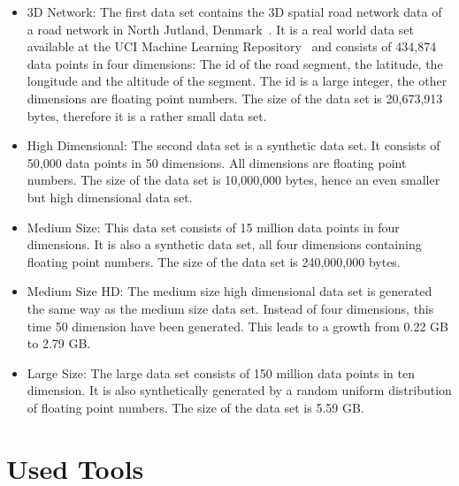\begin{itemize} 
\item 3D Network: The first data set contains the 3D spatial road network data of a road network in North Jutland, Denmark~\parencite{3dnet}. It is a real world data set available at the UCI Machine Learning Repository~\parencite{uci} and consists of 434,874 data points in four dimensions: The id of the road segment, the latitude, the longitude and the altitude of the segment. The id is a large integer, the other dimensions are floating point numbers. The size of the data set is 20,673,913 bytes, therefore it is a rather small data set.

\item High Dimensional: The second data set is a synthetic data set. It consists of 50,000 data points in 50 dimensions. All dimensions are floating point numbers. The size of the data set is 10,000,000 bytes, hence an even smaller but high dimensional data set.

\item Medium Size: This data set consists of 15 million data points in four dimensions. It is also a synthetic data set, all four dimensions containing floating point numbers. The size of the data set is 240,000,000 bytes.

\item Medium Size HD: The medium size high dimensional data set is generated the same way as the medium size data set. Instead of four dimensions, this time 50 dimension have been generated. This leads to a growth from 0.22 GB to 2.79 GB.  

\item Large Size: The large data set consists of 150 million data points in ten dimension. It is also synthetically generated by a random uniform distribution of floating point numbers. The size of the data set is 5.59 GB.
\end{itemize} 



\section{Used Tools}

